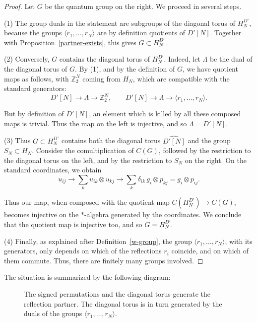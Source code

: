 \documentclass[11pt,a4paper]{article}
\begin{document}
\begin{proof}
Let $G$ be the quantum group on the right. We proceed in several steps.

(1) The group duals in the statement are subgroups of the diagonal torus of $H_N^{D'}$, because the groups $\langle r_1,\ldots,r_N\rangle$ are by definition quotients of $D'[N]$. Together with Proposition~\ref{partner-exists}, this gives $G\subset H_N^{D'}$.

(2) Conversely, $G$ contains the diagonal torus of $H_N^{D'}$. Indeed, let $\Lambda$ be the dual of the diagonal torus of $G$. By (1), and by the definition of $G$, we have quotient maps as follows, with $\mathbb Z_2^N$ coming from $H_N$, which are compatible with the standard generators:
\[
 D'[N]\to\Lambda\to\mathbb Z_2^N,\qquad D'[N]\to\Lambda\to\langle r_1,\ldots,r_N\rangle.
\]

But by definition of $D'[N]$, an element which is killed by all these composed maps is trivial. Thus the map on the left is injective, and so $\Lambda=D'[N]$.

(3) Thus $G\subset H_N^{D'}$ contains both the diagonal torus $\widehat{D'[N]}$ and the group $S_N\subset H_N$. Consider the comultiplication of $C(G)$, followed by the restriction to the diagonal torus on the left, and by the restriction to $S_N$ on the right. On the standard coordinates, we obtain
\[
 u_{ij}\to\sum_ku_{ik}\otimes u_{kj}\to\sum_k\delta_{ik}\,g_i\otimes p_{kj}=g_i\otimes p_{ij}.
\]

Thus our map, when composed with the quotient map $C(H_N^{D'})\to C(G)$, becomes injective on the $*$-algebra generated by the coordinates. We conclude that the quotient map is injective too, and so $G=H_N^{D'}$.

(4) Finally, as explained after Definition~\ref{w-group}, the group $\langle r_1,\ldots,r_N\rangle$, with its generators, only depends on which of the reflections $r_i$ coincide, and on which of them commute. Thus, there are finitely many groups involved.
\end{proof}

The situation is summarized by the following diagram:

\begin{figure}[H]\centering
{}
\caption{The signed permutations and the diagonal torus generate the reflection partner. The diagonal torus is in turn generated by the duals of the groups $\langle r_1,\ldots,r_N\rangle$.}
\end{figure}
\end{document}
